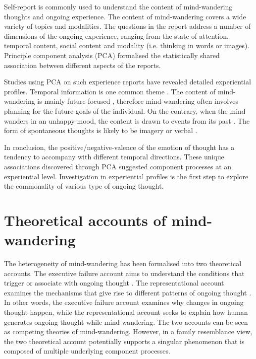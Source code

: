 Self-report is commonly used to understand the content of mind-wandering thoughts and ongoing experience. The content of mind-wandering covers a wide variety of topics and modalities. The questions in the report address a number of dimensions of the ongoing experience, ranging from the state of attention, temporal content, social content and modality (i.e. thinking in words or images). Principle component analysis (PCA) formalised the statistically shared association between different aspects of the reports. 

Studies using PCA on such experience reports have revealed detailed experiential profiles. Temporal information is one common theme \cite{RubyFP2013,RubyPlos2013}. The content of mind-wandering is mainly future-focused \cite{Baird2011}, therefore mind-wandering often involves planning for the future goals of the individual. On the contrary, when the mind wanders in an unhappy mood, the content is drawn to events from its past \cite{Smallwood2011}. The form of spontaneous thoughts is likely to be imagery or verbal \cite{Gorgolewski2014,Smallwood2016}. 

In conclusion, the positive/negative-valence of the emotion of thought has a tendency to accompany with different temporal directions. These unique associations discovered through PCA suggested component processes at an experiential level. Investigation in experiential profiles is the first step to explore the commonality of various type of ongoing thought. 


\section{Theoretical accounts of mind-wandering}
\label{ch:intro:accounts}

The heterogeneity of mind-wandering has been formalised into two theoretical accounts. The executive failure account aims to understand the conditions that trigger or associate with ongoing thought \cite{Kane2012,McVay2010}. The representational account examines the mechanisms that give rise to different patterns of ongoing thought \cite{Smallwood2016}. In other words, the executive failure account examines why changes in ongoing thought happen, while the representational account seeks to explain how human generates ongoing thought while mind-wandering. The two accounts can be seen as competing theories of mind-wandering. However, in a family resemblance view, the two theoretical account potentially supports a singular phenomenon that is composed of multiple underlying component processes. 

